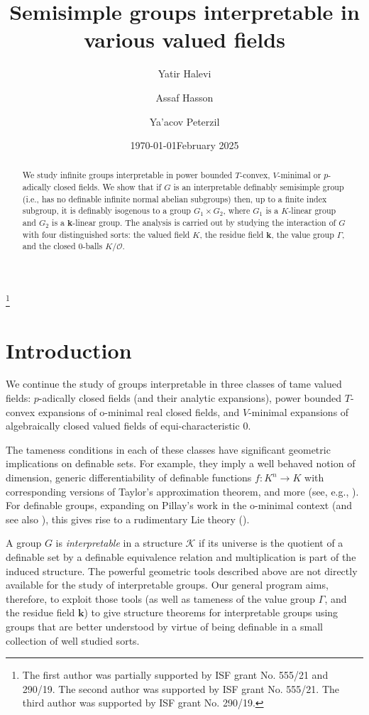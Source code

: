 \documentclass[11pt]{amsart}
\date{\today}
\title{Semisimple groups  interpretable in various valued fields}
\author{Yatir Halevi}
\author{Assaf Hasson}
\author{Ya'acov Peterzil}
\date{February 2025}
\theoremstyle{definition}
\newcommand{\bk}{\textbf{k}}
\newcommand{\CK}{{\mathcal K}}
\newcommand{\0}{\emptyset}
\begin{document}
\thanks{The first author was partially supported by ISF grant No. 555/21 and 290/19. The second author was supported by ISF grant No. 555/21. The third author was supported by ISF grant No. 290/19.}

\begin{abstract}
     We study infinite groups interpretable in power bounded $T$-convex, $V$-minimal or $p$-adically closed fields. We show that if $G$ is an interpretable definably semisimple group (i.e.,  has no definable infinite normal abelian subgroups) then, up to a finite index subgroup,  it is definably isogenous 
to a group $G_1\times G_2$, where $G_1$ is a $K$-linear group and $G_2$ is a $\mathbf{k}$-linear group. The analysis is carried out by studying the interaction of $G$ with four distinguished sorts: the valued field $K$, the residue field $\mathbf{k}$, the value group $\Gamma$,  and the closed $0$-balls  $K/\mathcal{O}$.  
\end{abstract}



\maketitle

\tableofcontents


\section{Introduction}

We continue the study of groups interpretable in three classes of tame valued fields: $p$-adically closed fields (and their analytic expansions), power bounded $T$-convex expansions of o-minimal real closed fields, and $V$-minimal expansions of algebraically closed valued fields of equi-characteristic $0$.  

The tameness conditions in each of these classes have significant geometric implications on definable sets. For example, they imply a well behaved notion of dimension, generic differentiability of definable functions $f: K^n\to K$ with corresponding versions of Taylor's approximation theorem, and more (see, e.g., \cite{hensel-min}). For definable groups, expanding on Pillay's work in the o-minimal context \cite{Pi5} (and see also \cite{PilQp}), this gives rise to a rudimentary Lie theory (\cite{AcHa}). 

 \vspace{.2cm} 
 

A group $G$ is  {\em interpretable} in a structure $\CK$ if its universe is the quotient of a definable set by a definable equivalence relation and multiplication is part of the induced structure. The powerful geometric tools described above are not directly available for the study of interpretable groups. 
Our general program aims, therefore, to exploit those tools (as well as tameness of the value group $\Gamma$,  and the residue field $\bk$) to give structure theorems for interpretable groups using groups that are better understood by virtue of being definable in a small collection of well studied sorts.    
\end{document}
